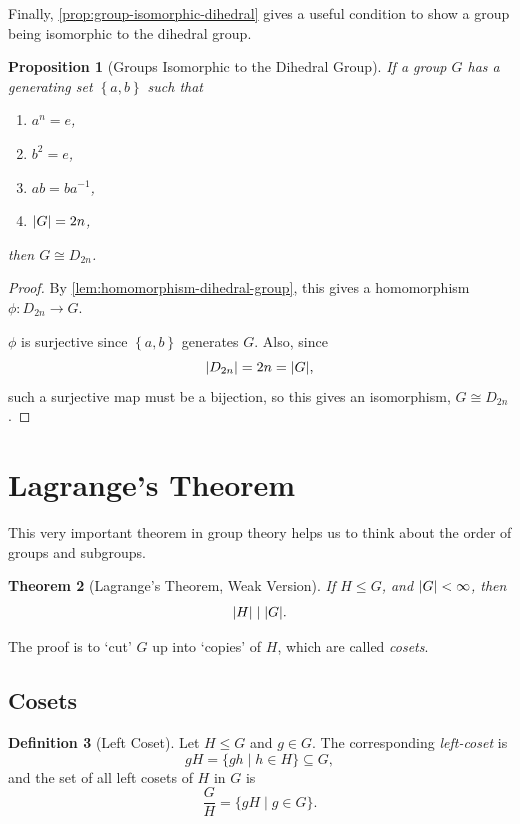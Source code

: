 \documentclass{article}
\newtheorem{theorem}{Theorem}[section]
\newtheorem{proposition}[theorem]{Proposition}
\theoremstyle{definition}
\newtheorem{definition}[theorem]{Definition}
\theoremstyle{remark}
\DeclarePairedDelimiter{\abs}{\lvert}{\rvert}
\newcommand{\Bqty}[1]{\left\{#1\right\}}
\newcommand{\set}[2]{\{#1\mid #2\}}
\newcommand{\flatfrac}[2]{\frac{#1}{#2}}
\newcommand{\functiondomain}[3]{#1:#2\to #3}
\newcommand{\inverse}{^{-1}}
\newcommand{\isomorphic}{\cong}
\newcommand{\subgroup}{\leq}
\newcommand{\divides}{\mid}
\begin{document}
Finally, \autoref{prop:group-isomorphic-dihedral} gives a useful condition to show a group being isomorphic to the dihedral group.

\begin{proposition}[Groups Isomorphic to the Dihedral Group]
    \label{prop:group-isomorphic-dihedral}%
    If a group \(G\) has a generating set \(\Bqty{a, b}\) such that
    \begin{enumerate}
        \item \(a^n = e\),
        \item \(b^2 = e\),
        \item \(ab = b a \inverse\),
        \item \(\abs{G} = 2n\),
    \end{enumerate}
    then \(G \isomorphic D_{2n}\).
\end{proposition}

\begin{proof}
    By \autoref{lem:homomorphism-dihedral-group}, this gives a homomorphism \(\functiondomain{\phi}{D_{2n}}{G}\).

    \(\phi\) is surjective since \(\Bqty{a, b}\) generates \(G\). Also, since
    \[
        \abs{D_{2n}} = 2n = \abs{G},
    \]
    such a surjective map must be a bijection, so this gives an isomorphism, \(G \isomorphic D_{2n}\).
\end{proof}

\section{Lagrange's Theorem}
\label{sec:lagranges-theorem}

This very important theorem in group theory helps us to think about the order of groups and subgroups.

\begin{theorem}[Lagrange's Theorem, Weak Version]
    \label{thm:lagrange-weak}%
    If \(H \subgroup G\), and \(\abs{G} < \infty\), then
    \[
        \abs{H} \divides \abs{G}.
    \]
\end{theorem}

The proof is to `cut' \(G\) up into `copies' of \(H\), which are called \emph{cosets}.

\subsection{Cosets}
\label{sec:cosets}

\begin{definition}[Left Coset]
    \label{def:left-coset}%
    Let \(H \subgroup G\) and \(g \in G\). The corresponding \emph{left-coset} is
    \[
        gH = \set{gh}{h \in H} \subseteq G,
    \]
    and the set of all left cosets of \(H\) in \(G\) is
    \[
        \flatfrac{G}{H} = \set{gH}{g \in G}.
    \]
\end{definition}
\end{document}
